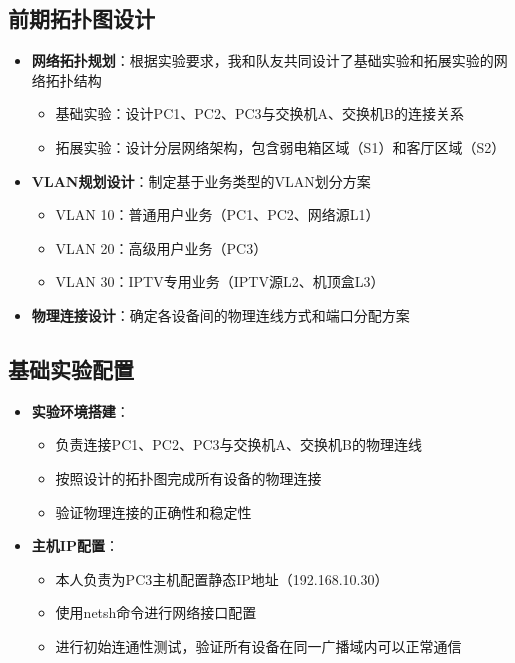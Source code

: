 \documentclass[a4paper]{article}
\begin{document}
\subsection{前期拓扑图设计}
\begin{itemize}
    \item \textbf{网络拓扑规划}：根据实验要求，我和队友共同设计了基础实验和拓展实验的网络拓扑结构
    \begin{itemize}
        \item 基础实验：设计PC1、PC2、PC3与交换机A、交换机B的连接关系
        \item 拓展实验：设计分层网络架构，包含弱电箱区域（S1）和客厅区域（S2）
    \end{itemize}
    \item \textbf{VLAN规划设计}：制定基于业务类型的VLAN划分方案
    \begin{itemize}
        \item VLAN 10：普通用户业务（PC1、PC2、网络源L1）
        \item VLAN 20：高级用户业务（PC3）
        \item VLAN 30：IPTV专用业务（IPTV源L2、机顶盒L3）
    \end{itemize}
    \item \textbf{物理连接设计}：确定各设备间的物理连线方式和端口分配方案
\end{itemize}

\subsection{基础实验配置}
\begin{itemize}
    \item \textbf{实验环境搭建}：
    \begin{itemize}
        \item 负责连接PC1、PC2、PC3与交换机A、交换机B的物理连线
        \item 按照设计的拓扑图完成所有设备的物理连接
        \item 验证物理连接的正确性和稳定性
    \end{itemize}
    \item \textbf{主机IP配置}：
    \begin{itemize}
        \item 本人负责为PC3主机配置静态IP地址（192.168.10.30）
        \item 使用netsh命令进行网络接口配置
        \item 进行初始连通性测试，验证所有设备在同一广播域内可以正常通信
    \end{itemize}
\end{itemize}
\end{document}
